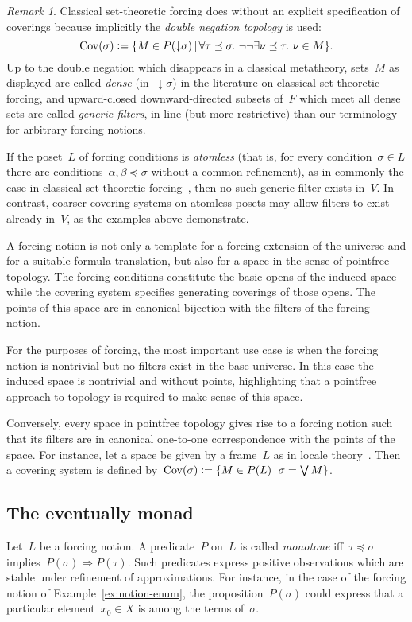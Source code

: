 \documentclass[com,11pt,crcready]{iosart2x}
\theoremstyle{definition}
\theoremstyle{plain}
\theoremstyle{remark}
\newtheorem{remark}[definition]{Remark}
\newcommand{\defeq}{\vcentcolon=}
\newcommand{\Cov}{\mathrm{Cov}}
\renewcommand{\_}{\mathpunct{.}\,}
\begin{document}
\begin{remark}Classical set-theoretic forcing
does without an explicit specification of coverings because implicitly the
\emph{double negation topology} is used:
\[ \Cov(\sigma) \defeq \{ M \in P({\downarrow}\sigma) \,|\,
  \forall \tau \preceq \sigma\_ \neg\neg \exists \nu \preceq \tau\_ \nu \in M
  \}. \]
Up to the double negation which disappears in a classical metatheory, sets~$M$ as displayed are called
\emph{dense} (in~${\downarrow}\sigma$) in the literature on classical set-theoretic forcing, and
upward-closed downward-directed subsets of~$F$ which meet all dense sets are
called \emph{generic filters}, in line (but more restrictive) than our
terminology for arbitrary forcing notions.

If the poset~$L$ of forcing conditions is \emph{atomless} (that is, for every
condition~$\sigma \in L$ there are conditions~$\alpha,\beta \preceq \sigma$
without a common refinement), as in commonly the case in classical
set-theoretic forcing~\cite[Lemma~1.33]{schilhan:bsc}, then no such generic filter exists in~$V$.
In contrast, coarser covering systems on atomless posets may allow
filters to exist already in~$V$, as the examples above demonstrate.
\end{remark}

A forcing notion is not only a template for a forcing extension of the universe and
for a suitable formula translation, but also for a space in the sense of
pointfree topology. The forcing conditions constitute the basic opens of the
induced space while the covering system specifies generating coverings of
those opens. The points of this space are in canonical bijection with the
filters of the forcing notion.

For the purposes of forcing, the most important use case is when the forcing
notion is nontrivial but no filters exist in the base universe. In this case
the induced space is nontrivial and without points, highlighting that a
pointfree approach to topology is required to make sense of this space.

Conversely, every space in pointfree topology gives rise to a forcing notion such that its
filters are in canonical one-to-one correspondence with the points of the space.
For instance, let a space be given by a frame~$L$ as in locale
theory~\cite{picado-pultr:frames-and-locales}. Then a covering system is
defined by~$\Cov(\sigma) \defeq \{ M \in P(L) \,|\, \sigma = \bigvee M \}$.


\subsection{The eventually monad} Let~$L$ be a forcing notion. A
predicate~$P$ on~$L$ is called \emph{monotone} iff~$\tau \preceq \sigma$
implies~$P(\sigma) \Rightarrow P(\tau)$. Such predicates express positive
observations which are stable under refinement of approximations. For
instance, in the case of the forcing notion of Example~\ref{ex:notion-enum},
the proposition~$P(\sigma)$ could express that a particular element~$x_0 \in X$
is among the terms of~$\sigma$.
\end{document}
